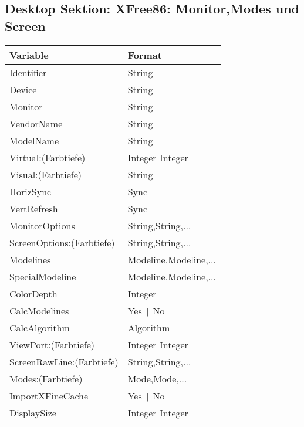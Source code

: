 \subsection{Desktop Sektion: XFree86: Monitor,Modes und Screen}
\begin{tabular}[h]{|p{5cm}|p{7cm}|}
 \hline
 \textbf{Variable}     & \textbf{Format}        \\
 \hline
 Identifier                & String                          \\  
 Device                    & String                          \\
 Monitor                   & String                          \\
 VendorName                & String                          \\
 ModelName                 & String                          \\
 Virtual:(Farbtiefe)       & Integer Integer                 \\
 Visual:(Farbtiefe)        & String                          \\
 HorizSync                 & Sync                            \\
 VertRefresh               & Sync                            \\
 MonitorOptions            & String,String,...               \\
 ScreenOptions:(Farbtiefe) & String,String,...               \\
 Modelines                 & Modeline,Modeline,...           \\
 SpecialModeline           & Modeline,Modeline,...           \\
 ColorDepth                & Integer                         \\
 CalcModelines             & Yes \verb+|+ No                 \\
 CalcAlgorithm             & Algorithm                       \\
 ViewPort:(Farbtiefe)      & Integer Integer                 \\
 ScreenRawLine:(Farbtiefe) & String,String,...               \\
 Modes:(Farbtiefe)         & Mode,Mode,...                   \\
 ImportXFineCache          & Yes \verb+|+ No                 \\
 DisplaySize               & Integer Integer                 \\
 \hline
\end{tabular}\\

